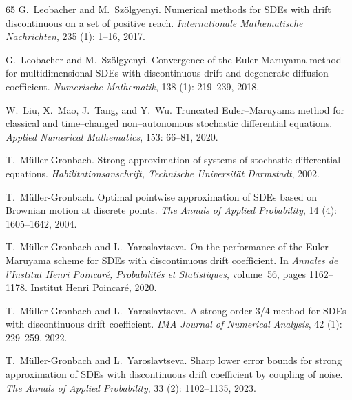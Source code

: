 \documentclass[11pt,a4paper]{article}
\numberwithin{equation}{section}
\theoremstyle{definition}
\begin{document}
{\begin{thebibliography}{65}
G.~Leobacher and M.~Sz\"olgyenyi.
\newblock Numerical methods for {SDE}s with drift discontinuous on a set of positive reach.
\newblock \emph{Internationale Mathematische Nachrichten}, 235 (1): 1--16, 2017{}.

G.~Leobacher and M.~Sz\"olgyenyi.
\newblock Convergence of the {E}uler-{M}aruyama method for multidimensional {SDE}s with discontinuous drift and degenerate diffusion coefficient.
\newblock \emph{Numerische Mathematik}, 138 (1): 219--239, 2018.

W.~Liu, X.~Mao, J.~Tang, and Y.~Wu.
\newblock Truncated {E}uler--{M}aruyama method for classical and time--changed non--autonomous stochastic differential equations.
\newblock \emph{Applied Numerical Mathematics}, 153: 66--81, 2020.

T.~M{\"u}ller-Gronbach.
\newblock Strong approximation of systems of stochastic differential equations.
\newblock \emph{Habilitationsanschrift, Technische Universit{\"a}t Darmstadt}, 2002.

T.~M{\"u}ller-Gronbach.
\newblock Optimal pointwise approximation of {SDE}s based on {B}rownian motion at discrete points.
\newblock \emph{The Annals of Applied Probability}, 14 (4): 1605--1642, 2004.

T.~M{\"u}ller-Gronbach and L.~Yaroslavtseva.
\newblock On the performance of the {E}uler--{M}aruyama scheme for {SDE}s with discontinuous drift coefficient.
\newblock In \emph{Annales de l'Institut Henri Poincar{\'e}, Probabilit{\'e}s et Statistiques}, volume~56, pages 1162--1178. Institut Henri Poincar{\'e}, 2020.

T.~M{\"u}ller-Gronbach and L.~Yaroslavtseva.
\newblock A strong order 3/4 method for {SDE}s with discontinuous drift coefficient.
\newblock \emph{IMA Journal of Numerical Analysis}, 42 (1): 229--259, 2022.

T.~M{\"u}ller-Gronbach and L.~Yaroslavtseva.
\newblock Sharp lower error bounds for strong approximation of {SDE}s with discontinuous drift coefficient by coupling of noise.
\newblock \emph{The Annals of Applied Probability}, 33 (2): 1102--1135, 2023.


\end{thebibliography}}
\end{document}
